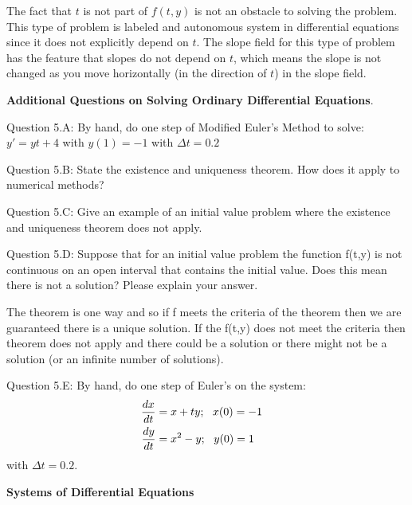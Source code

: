\documentclass{article}
\def\ds{\displaystyle}
\begin{document}
{\color{teal} The fact that $t$ is not part of $f(t,y)$ is not an obstacle to solving the problem. This type of problem is labeled and autonomous system in differential equations since it does not explicitly depend on $t$. The slope field for this type of problem has the feature that slopes do not depend on $t$, which means the slope is not changed as you move horizontally (in the direction of $t$) in the slope field. }
\medskip \par \noindent
{\bf Additional Questions on Solving Ordinary Differential Equations}. \medskip \par \noindent
Question 5.A: By hand, do one step of Modified Euler's Method to solve: $\ds y' = yt+4$ with $y(1)=-1$ with $\ds \Delta t = 0.2$
\medskip \par \noindent
Question 5.B:  State the existence and uniqueness theorem. How does it apply to numerical methods?
\medskip \par \noindent
Question 5.C: Give an example of an initial value problem where the existence and uniqueness theorem does not apply. 
\medskip \par \noindent
Question 5.D: Suppose that for an initial value problem the function f(t,y) is not continuous on an open interval that contains the initial value. Does this mean there is not a solution? Please explain your answer. 

{\color{teal} The theorem is one way and so if f meets the criteria of the theorem then we are guaranteed there is a unique solution. If the f(t,y) does not meet the criteria then theorem does not apply and there could be a solution or there might not be a solution (or an infinite number of solutions). }


\medskip \par \noindent
Question 5.E: By hand, do one step of Euler's on the system:
\begin{align*}
    \frac {dx}{dt} &= x + ty; \ \ x(0)=-1 \cr 
    \frac {dy}{dt} &= x^2 - y; \ \ y(0)= 1
\end{align*}
with $\ds \Delta t = 0.2$.
\par \bigskip \par \noindent
{\bf Systems of Differential Equations} \par \medskip \noindent
\end{document}

